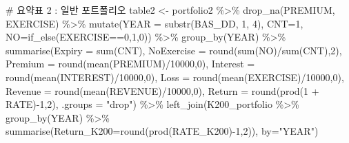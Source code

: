 \documentclass[
  a4paper,
  DIV=11,
  numbers=noendperiod]{scrreprt}
\newenvironment{Shaded}{\begin{snugshade}}{\end{snugshade}}
\newcommand{\AttributeTok}[1]{\textcolor[rgb]{0.40,0.45,0.13}{#1}}
\newcommand{\CommentTok}[1]{\textcolor[rgb]{0.37,0.37,0.37}{#1}}
\newcommand{\DecValTok}[1]{\textcolor[rgb]{0.68,0.00,0.00}{#1}}
\newcommand{\FunctionTok}[1]{\textcolor[rgb]{0.28,0.35,0.67}{#1}}
\newcommand{\NormalTok}[1]{\textcolor[rgb]{0.00,0.23,0.31}{#1}}
\newcommand{\OtherTok}[1]{\textcolor[rgb]{0.00,0.23,0.31}{#1}}
\newcommand{\SpecialCharTok}[1]{\textcolor[rgb]{0.37,0.37,0.37}{#1}}
\newcommand{\StringTok}[1]{\textcolor[rgb]{0.13,0.47,0.30}{#1}}
\begin{document}
\begin{Shaded}
\begin{Highlighting}[]
\CommentTok{\# 요약표 2 : 일반 포트폴리오}
\NormalTok{table2 }\OtherTok{\textless{}{-}}\NormalTok{ portfolio2 }\SpecialCharTok{\%\textgreater{}\%}
  \FunctionTok{drop\_na}\NormalTok{(PREMIUM, EXERCISE) }\SpecialCharTok{\%\textgreater{}\%}
  \FunctionTok{mutate}\NormalTok{(}\AttributeTok{YEAR =} \FunctionTok{substr}\NormalTok{(BAS\_DD, }\DecValTok{1}\NormalTok{, }\DecValTok{4}\NormalTok{),}
         \AttributeTok{CNT=}\DecValTok{1}\NormalTok{,}
         \AttributeTok{NO=}\FunctionTok{if\_else}\NormalTok{(EXERCISE}\SpecialCharTok{==}\DecValTok{0}\NormalTok{,}\DecValTok{1}\NormalTok{,}\DecValTok{0}\NormalTok{)) }\SpecialCharTok{\%\textgreater{}\%}
  \FunctionTok{group\_by}\NormalTok{(YEAR) }\SpecialCharTok{\%\textgreater{}\%}
  \FunctionTok{summarise}\NormalTok{(}\AttributeTok{Expiry =} \FunctionTok{sum}\NormalTok{(CNT),}
            \AttributeTok{NoExercise =} \FunctionTok{round}\NormalTok{(}\FunctionTok{sum}\NormalTok{(NO)}\SpecialCharTok{/}\FunctionTok{sum}\NormalTok{(CNT),}\DecValTok{2}\NormalTok{),}
            \AttributeTok{Premium =} \FunctionTok{round}\NormalTok{(}\FunctionTok{mean}\NormalTok{(PREMIUM)}\SpecialCharTok{/}\DecValTok{10000}\NormalTok{,}\DecValTok{0}\NormalTok{),}
            \AttributeTok{Interest =} \FunctionTok{round}\NormalTok{(}\FunctionTok{mean}\NormalTok{(INTEREST)}\SpecialCharTok{/}\DecValTok{10000}\NormalTok{,}\DecValTok{0}\NormalTok{),}
            \AttributeTok{Loss =} \FunctionTok{round}\NormalTok{(}\FunctionTok{mean}\NormalTok{(EXERCISE)}\SpecialCharTok{/}\DecValTok{10000}\NormalTok{,}\DecValTok{0}\NormalTok{),}
            \AttributeTok{Revenue =} \FunctionTok{round}\NormalTok{(}\FunctionTok{mean}\NormalTok{(REVENUE)}\SpecialCharTok{/}\DecValTok{10000}\NormalTok{,}\DecValTok{0}\NormalTok{),}
            \AttributeTok{Return =} \FunctionTok{round}\NormalTok{(}\FunctionTok{prod}\NormalTok{(}\DecValTok{1} \SpecialCharTok{+}\NormalTok{ RATE)}\SpecialCharTok{{-}}\DecValTok{1}\NormalTok{,}\DecValTok{2}\NormalTok{),}
            \AttributeTok{.groups =} \StringTok{"drop"}\NormalTok{) }\SpecialCharTok{\%\textgreater{}\%} 
  \FunctionTok{left\_join}\NormalTok{(K200\_portfolio }\SpecialCharTok{\%\textgreater{}\%} \FunctionTok{group\_by}\NormalTok{(YEAR) }\SpecialCharTok{\%\textgreater{}\%} \FunctionTok{summarise}\NormalTok{(}\AttributeTok{Return\_K200=}\FunctionTok{round}\NormalTok{(}\FunctionTok{prod}\NormalTok{(RATE\_K200)}\SpecialCharTok{{-}}\DecValTok{1}\NormalTok{,}\DecValTok{2}\NormalTok{)),}
            \AttributeTok{by=}\StringTok{"YEAR"}\NormalTok{)}


\end{Highlighting}
\end{Shaded}
\end{document}
